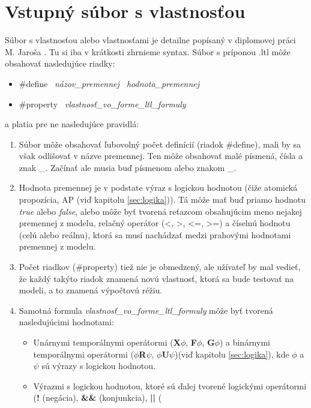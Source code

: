 \documentclass[11pt,final,oneside]{fithesis}
\begin{document}
\section{Vstupn\'y s\'ubor s vlastnos\v{t}ou}
\label{sec:propertyFile}
S\'ubor s vlastnos\v tou alebo vlastnos\v tami je detailne pop\'isan\'y v diplomovej pr\'aci M. Jaro\v sa \cite{Jaros-thesis}. Tu si iba v kr\'atkosti zhrnieme syntax. S\'ubor 
s pr\'iponou .ltl m\^ o\v ze obsahova\v t nasleduj\'uce riadky:
\begin{itemize}
\item \#define \ {\it n\'azov\_premennej \ hodnota\_premennej}
\item \#property \ {\it vlastnos\v t\_vo\_forme\_ltl\_formuly}
\end{itemize}
a platia pre ne nasleduj\'uce pravidl\'a:
\begin{enumerate}
\item S\'ubor m\^ o\v ze obsahova\v t \v lubovoln\'y po\v cet defin\'ici\'i (riadok \#define), mali by sa v\v sak odli\v sova\v t v n\'azve premennej. Ten m\^ o\v ze obsahova\v t
mal\'e p\'ismen\'a, \v c\'isla a znak \_. Za\v c\'ina\v t ale musia bu\v d p\'ismenom alebo znakom \_.
\item Hodnota premennej je v podstate v\'yraz s logickou hodnotou (\v ci\v ze atomick\'a propoz\'icia, AP (vi\v d kapitolu \ref{sec:logika})). T\'a m\^ o\v ze 
ma\v t bu\v d priamo
hodnotu {\it true} alebo {\it false}, alebo m\^ o\v ze by\v t tvoren\'a re\v tazcom obsahuj\'ucim meno nejakej premennej z modelu, rela\v cn\'y oper\'ator (<, >, <=, >=) a \v c\'iseln\'u 
hodnotu (cel\'u alebo re\'alnu), ktor\'a sa mus\'i nach\'adza\v t medzi prahov\'ymi hodnotami premennej z modelu.
\item Po\v cet riadkov (\#property) tie\v z nie je obmedzen\'y, ale u\v z\'ivate\v l by mal vedie\v t, \v ze ka\v zd\'y tak\'yto riadok znamen\'a nov\'u 
vlastnos\v t, ktor\'a sa bude testova\v t na modeli, a to znamen\'a v\'ypo\v ctov\'u r\'e\v ziu.
\item Samotn\'a formula {\it vlastnos\v t\_vo\_forme\_ltl\_formuly} m\^ o\v ze by\v t tvoren\'a nasleduj\'ucimi hodnotami:
\begin{itemize}
\item Un\'arnymi tempor\'alnymi oper\'atormi ({\bf X}$\phi$, {\bf F}$\phi$, {\bf G}$\phi$) a bin\'arnymi tempor\'alnymi oper\'atormi ($\phi${\bf R}$\psi$, 
$\phi${\bf U}$\psi$)(vi\v d kapitolu \ref{sec:logika}), kde $\phi$ a $\psi$ s\'u v\'yrazy s logickou hodnotou.
\item V\'yrazmi s logickou hodnotou, ktor\'e s\'u \v dalej tvoren\'e logick\'ymi oper\'atormi ({\bf !} (neg\'acia), {\bf \&\&} (konjunkcia), {\bf ||} (

\end{itemize}
\end{enumerate}
\end{document}

